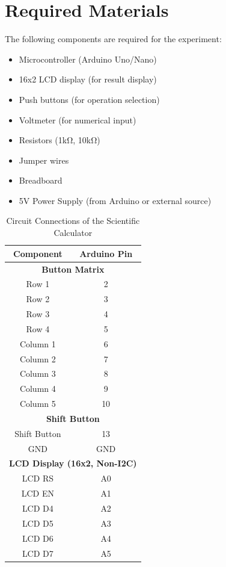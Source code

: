 \documentclass[a4paper,12pt]{article}
\begin{document}
\section{Required Materials}
The following components are required for the experiment:
\begin{itemize}
    \item {Microcontroller} (Arduino Uno/Nano)
    \item {16x2 LCD display} (for result display)
    \item {Push buttons} (for operation selection)
    \item {Voltmeter} (for numerical input)
    \item {Resistors} (1kΩ, 10kΩ)
    \item {Jumper wires}
    \item {Breadboard}
    \item {5V Power Supply} (from Arduino or external source)
\end{itemize}


\begin{table}[H]
    \centering
    \renewcommand{\arraystretch}{1.2} %
    \begin{tabular}{|c|c|}
        \hline
        \textbf{Component} & \textbf{Arduino Pin} \\
        \hline
        \multicolumn{2}{|c|}{\textbf{Button Matrix}} \\
        \hline
        Row 1 & 2 \\
        Row 2 & 3 \\
        Row 3 & 4 \\
        Row 4 & 5 \\
        Column 1 & 6 \\
        Column 2 & 7 \\
        Column 3 & 8 \\
        Column 4 & 9 \\
        Column 5 & 10 \\
        \hline
        \multicolumn{2}{|c|}{\textbf{Shift Button}} \\
        \hline
        Shift Button & 13 \\
        GND & GND \\
        \hline
        \multicolumn{2}{|c|}{\textbf{LCD Display (16x2, Non-I2C)}} \\
        \hline
        LCD RS & A0 \\
        LCD EN & A1 \\
        LCD D4 & A2 \\
        LCD D5 & A3 \\
        LCD D6 & A4 \\
        LCD D7 & A5 \\
        \hline
    \end{tabular}
    \caption{Circuit Connections of the Scientific Calculator}
    \label{tab:circuit_connections}
\end{table}
\newpage
\end{document}
